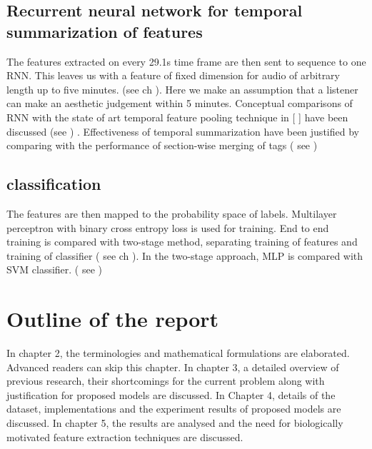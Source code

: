 \subsection{ Recurrent neural network for temporal summarization of features}
 The features extracted on every 29.1s time frame are then sent to sequence to one RNN. This leaves us with a feature of fixed dimension for audio of arbitrary length up to five minutes. (see ch ). Here we make an assumption that a listener can make an aesthetic judgement within 5 minutes. Conceptual comparisons of RNN with the state of art temporal feature pooling technique in [ ] have been discussed (see ) . Effectiveness of temporal summarization have been justified by comparing with the performance of section-wise merging of tags ( see )

\subsection{ classification }
The features are then mapped to the probability space of labels. Multilayer perceptron with binary cross entropy loss is used for training. End to end training is compared with two-stage method, separating  training of features and training of classifier ( see ch ). In the two-stage approach, MLP is compared with SVM classifier. ( see )




\section{Outline of the report}
In chapter 2, the terminologies and mathematical formulations are elaborated. Advanced readers can skip this chapter. In chapter 3, a detailed overview of previous research, their shortcomings for the current problem along with justification for proposed models are discussed. In Chapter 4, details of the dataset, implementations and the experiment results of proposed models are discussed. In chapter 5, the results are analysed and the need for biologically motivated feature extraction techniques are discussed. 






